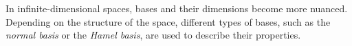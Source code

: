 \documentclass[12pt, reqno]{amsart}
\newtheorem{theorem}{Theorem}[section]
\theoremstyle{definition}
\numberwithin{equation}{section}
\newcommand{\tabb}{\hspace*{1cm}}
\begin{document}
\begin{comment}
Two vector spaces are the same if they have the same dimension and basis.
Understanding the relationship between a vector space and its subspaces is crucial, as subspaces inherit properties like dimensionality from the larger space. A key theorem states that any subspace of a finite-dimensional vector space is also finite-dimensional and provides conditions for when a subspace equals the entire space.
    
    \begin{theorem}
        Let $W$ be a subspace of a finite-dimensional vector space $V$. Then:\\
        (1) $W$ is also finite-dimensional and $dim(W) \leq dim(V)$. \\
        (2) If $dim(W) = dim(V)$, then $W=V$
    \end{theorem}
    \begin{proof} \hfill \\
        (1) Let $dim(V)=n$. If $W={0}$, then $dim(W)=0 \leq n$.\\
        Otherwise, $W$ contains a nonzero vector $w_1$ and $\{w_1\}$ is a linearly independent set.\\
        Choose vectors $w_1,..., W_k$ such that $\{w_1,...,w_k\}$ is linearly independent.\\
        Any linearly independent set of $V$ contains at most $n$ vector because $dim(V)=n$.\\
        So $k \leq n$ and $\{w_1,...,w_k\}$ is linearly independent but adjoining any other vector from $W$ would form a linearly dependent set.\\
        This implies that $\{w_1,...,w_k\}$ generates $W$.\\
        Thus, it is a basis for $W$.\\
        \tabb It follows that $dim(W) = k \leq n$.\\
        \\
        (2) Suppose $dim(W) = dim(V) =n$.\\
        Then a basis of $W$ is a linearly independent subset of $V$ containing $n$ vectors.\\
        This implies it is also a basis for $V$.\\
        \tabb Hence, $W =V$.
    \end{proof}    
\end{comment}

In infinite-dimensional spaces, bases and their dimensions become more nuanced. Depending on the structure of the space, different types of bases, such as the \textit{normal basis} or the \textit{Hamel basis}, are used to describe their properties.\\
\end{document}

